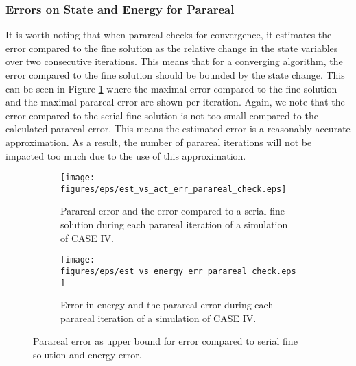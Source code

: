 \subsubsection{Errors on State and Energy for Parareal}
\label{sub: errors}
It is worth noting that when parareal checks for convergence, it estimates the error compared to the fine solution as the relative change in the state variables over two consecutive iterations. This means that for a converging algorithm, the error compared to the fine solution should be bounded by the state change. This can be seen in Figure \ref{fig: error-vs-statechange} where the maximal error compared to the fine solution and the maximal parareal error are shown per iteration. Again, we note that the error compared to the serial fine solution is not too small compared to the calculated parareal error. This means the estimated error is a reasonably accurate approximation. As a result, the number of parareal iterations will not be impacted too much due to the use of this approximation.
\begin{figure}[h]
\centering
\begin{subfigure}{0.49\linewidth}
    \texttt{[image: figures/eps/est\_vs\_act\_err\_parareal\_check.eps]}
    \caption{Parareal error and the error compared to a serial fine solution during each parareal iteration of a simulation of CASE IV.}
    \label{fig: error-vs-statechange}
\end{subfigure}
\hfill
\begin{subfigure}{0.49\linewidth}
    \centering
    \texttt{[image: figures/eps/est\_vs\_energy\_err\_parareal\_check.eps]}
    \caption{Error in energy and the parareal error during each parareal iteration of a simulation of CASE IV.}
    \label{fig: energy-vs-statechange}
\end{subfigure}
\caption{Parareal error as upper bound for error compared to serial fine solution and energy error.}
\label{fig: parareal bound}
\end{figure}


